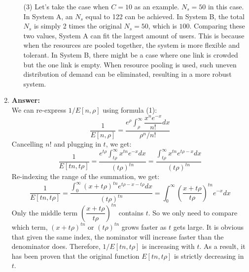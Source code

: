 \documentclass[12pt]{article}
\begin{document}
\begin{enumerate}
\begin{itemize}
\item[(3)]Let's take the case when $C=10$ as an example. $N_s=50$ in this case. 
\medskip\\
In System A, an $N_s$ equal to 122 can be achieved. In System B, the total $N_s$ is simply 2 times the original $N_s=50$, which is $100$. Comparing these two values, System A can fit the largest amount of users. This is because when the resources are pooled together, the system is more flexible and tolerant. In System B, there might be a case where one link is crowded but the one link is empty. When resource pooling is used, such uneven distribution of demand can be eliminated, resulting in a more robust system.
\end{itemize}
\item{} \textbf{Answer:}
\medskip\\
We can re-express $1/E[n,\rho]$ using formula (1):
$$\dfrac{1}{E[n,\rho]}=\dfrac{e^\rho\int_\rho^\infty\dfrac{x^ne^{-x}}{n!}dx}{\rho^n/n!}$$
Cancelling $n!$ and plugging in $t$, we get:
$$\dfrac{1}{E[tn,t\rho]}=\dfrac{e^{t\rho}\int_{t\rho}^\infty x^{tn}e^{-x}dx}{(t\rho)^{tn}}=\dfrac{\int_{t\rho}^\infty x^{tn}e^{t\rho-x}dx}{(t\rho)^{tn}}$$
Re-indexing the range of the summation, we get:
$$\dfrac{1}{E[tn,t\rho]}=\dfrac{\int_0^\infty(x+t\rho)^{tn}e^{t\rho-x-t\rho}dx}{(t\rho)^{tn}}=\int_0^\infty(\dfrac{x+t\rho}{t\rho})^{tn}e^{-x}dx$$
Only the middle term $(\dfrac{x+t\rho}{t\rho})^{tn}$ contains $t$. So we only need to compare which term, $(x+t\rho)^{tn}$ or $(t\rho)^{tn}$ grows faster as $t$ gets large. It is obvious that given the same index, the nominator will increase faster than the denominator does. Therefore, $1/E[tn,t\rho]$ is increasing with $t$. As a result, it has been proven that the original function $E[tn,t\rho]$ is strictly decreasing in $t$.


\end{enumerate}
\end{document}
